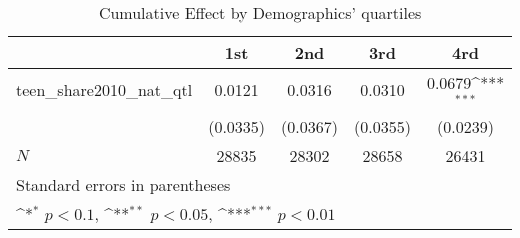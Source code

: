 \begin{table}[htbp]\centering
\def\sym#1{\ifmmode^{#1}\else\(^{#1}\)\fi}
\caption{Cumulative Effect by Demographics' quartiles}
\begin{tabular}{l*{4}{c}}
\hline\hline
            &\multicolumn{1}{c}{1st}&\multicolumn{1}{c}{2nd}&\multicolumn{1}{c}{3rd}&\multicolumn{1}{c}{4rd}\\
\hline
teen\_share2010\_nat\_qtl&      0.0121         &      0.0316         &      0.0310         &      0.0679\sym{***}\\
            &    (0.0335)         &    (0.0367)         &    (0.0355)         &    (0.0239)         \\
\hline
\(N\)       &       28835         &       28302         &       28658         &       26431         \\
\hline\hline
\multicolumn{5}{l}{\footnotesize Standard errors in parentheses}\\
\multicolumn{5}{l}{\footnotesize \sym{*} \(p<0.1\), \sym{**} \(p<0.05\), \sym{***} \(p<0.01\)}\\
\end{tabular}
\end{table}
